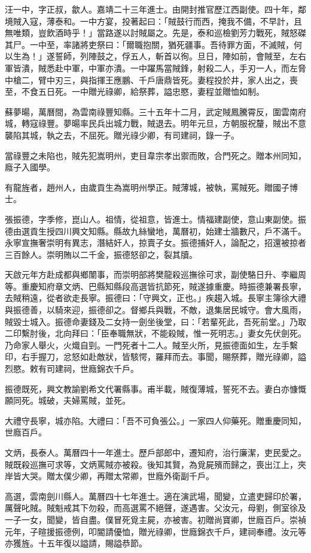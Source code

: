 \begin{pinyinscope}
汪一中，字正叔，歙人。嘉靖二十三年進士。由開封推官歷江西副使。四十年，鄰境賊入寇，薄泰和。一中方宴，投著起曰：「賊鼓行而西，掩我不備，不早計，且無唯類，豈飲酒時乎！」當路遂以討賊屬之。先是，泰和巡檢劉芳力戰死，賊怒磔其尸。一中至，率諸將吏祭曰：「爾職抱關，猶死疆事。吾待罪方面，不滅賊，何以生為！」遂誓師，列陣鼓之，俘五人，斬首以徇。旦日，陣如前，會賊至，左右軍皆潰，賊悉赴中軍，中軍亦潰。一中躍馬當賊鋒，射殺二人，手刃一人，而左脅中槍二，臂中刃三，與指揮王應鵬、千戶唐鼎皆死。妻程投於井，家人出之，喪至，不食五日死。一中贈光祿卿，給祭葬，謚忠愍，妻程並贈恤如制。

蘇夢暘，萬曆間，為雲南祿豐知縣。三十五年十二月，武定賊鳳騰霄反，圍雲南府城，轉寇祿豐。夢暘率民兵出城力戰，賊退去。明年元旦，方朝服祝釐，賊出不意襲陷其城，執之去，不屈死。贈光祿少卿，有司建祠，錄一子。

當祿豐之未陷也，賊先犯嵩明州，吏目韋宗孝出禦而敗，合門死之。贈本州同知，廕子入國學。

有龍旌者，趙州人，由歲貢生為嵩明州學正。賊薄城，被執，罵賊死。贈國子博士。

張振德，字季修，崑山人。祖情，從祖意，皆進士。情福建副使，意山東副使。振德由選貢生授四川興文知縣。縣故九絲蠻地，萬曆初，始建士牆數尺，戶不滿千。永寧宣撫奢崇明有異志，潛結奸人，掠賣子女。振德捕奸人，論配之，招還被掠者三百餘人。崇明賄以二千金，振德怒卻之，裂其牘。

天啟元年方赴成都與鄉闈事，而崇明部將樊龍殺巡撫徐可求，副使駱日升、李繼周等。重慶知府章文炳、巴縣知縣段高選皆抗節死，賊遂據重慶。時振德兼署長寧，去賊稍遠，從者欲走長寧。振德曰：「守興文，正也。」疾趨入城。長寧主簿徐大禮與振德善，以騎來迎，振德卻之。督鄉兵與戰，不敵，退集居民城守。會大風雨，賊毀士城入。振德命妻錢及二女持一劍坐後堂，曰：「若輩死此，吾死前堂。」乃取二印繫肘後，北向拜曰：「臣奉職無狀，不能殺賊，惟一死明志。」妻女先伏劍死。乃命家人舉火，火熾自剄。一門死者十二人。賊至火所，見振德面如生，左手繫印，右手握刀，忿怒如赴敵狀，皆駭愕，羅拜而去。事聞，賜祭葬，贈光祿卿，謚烈愍。敕有司建祠，世廕錦衣千戶。

振德既死，興文教諭劉希文代署縣事。甫半載，賊復薄城，誓死不去。妻白亦慷慨願同死。城破，夫婦罵賊，並死。

大禮守長寧，城亦陷。大禮曰：「吾不可負張公。」一家四人仰藥死。贈重慶同知，世廕百戶。

文炳，長泰人。萬曆四十一年進士。歷戶部郎中，遷知府，治行廉潔，吏民愛之。賊既殺巡撫可求等，文炳罵賊亦被殺。後知其賢，為覓屍殯而歸之，喪出江上，夾岸皆大哭。贈太僕少卿，再贈太常卿，世廕外衛副千戶。

高選，雲南劍川縣人。萬曆四十七年進士。適在演武場，聞變，立遣吏歸印於署，厲聲叱賊。賊魁戒其下勿殺，而高選罵不絕聲，遂遇害。父汝元，母劉，側室徐及一子一女，聞變，皆自盡。僕冒死覓主屍，亦被害。初贈尚寶卿，世廕百戶。崇禎元年，子暄援振德例，叩閽請優恤，贈光祿卿，世廕錦衣千戶，建祠奉禮。汝元等亦獲旌。十五年復以謚請，賜謚恭節。


\end{pinyinscope}
